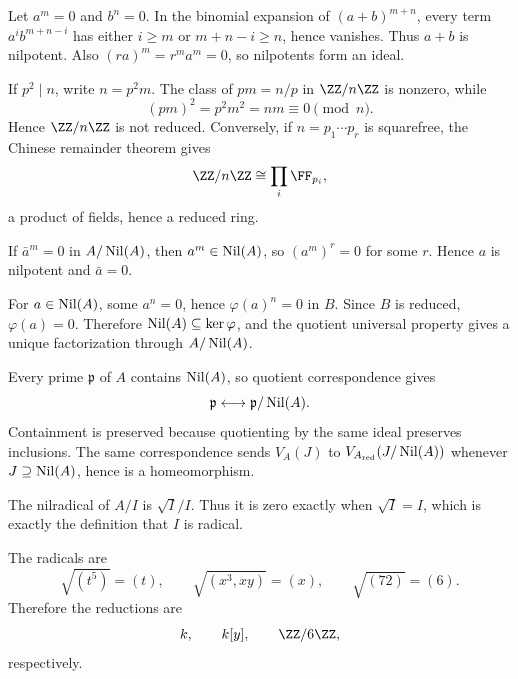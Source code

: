 \begin{solution}
Let $a^m=0$ and $b^n=0$.  In the binomial expansion of $(a+b)^{m+n}$, every term
$a^i b^{m+n-i}$ has either $i\ge m$ or $m+n-i\ge n$, hence vanishes.  Thus $a+b$ is
nilpotent.  Also $(ra)^m=r^m a^m=0$, so nilpotents form an ideal.
\end{solution}

\begin{solution}
If $p^2\mid n$, write $n=p^2m$.  The class of $pm=n/p$ in $\ZZ/n\ZZ$ is nonzero,
while
\[
(pm)^2=p^2m^2=n m\equiv0\pmod n.
\]
Hence $\ZZ/n\ZZ$ is not reduced.  Conversely, if $n=p_1\cdots p_r$ is squarefree,
the Chinese remainder theorem gives
\[
\ZZ/n\ZZ\cong\prod_i\FF_{p_i},
\]
a product of fields, hence a reduced ring.
\end{solution}

\begin{solution}
If $\bar a^m=0$ in $A/\operatorname{Nil}(A)$, then $a^m\in\operatorname{Nil}(A)$, so $(a^m)^r=0$ for some $r$.
Hence $a$ is nilpotent and $\bar a=0$.
\end{solution}

\begin{solution}
For $a\in\operatorname{Nil}(A)$, some $a^n=0$, hence $\varphi(a)^n=0$ in $B$.  Since $B$ is reduced,
$\varphi(a)=0$.  Therefore $\operatorname{Nil}(A)\subseteq\ker\varphi$, and the quotient universal
property gives a unique factorization through $A/\operatorname{Nil}(A)$.
\end{solution}

\begin{solution}
Every prime $\mathfrak p$ of $A$ contains $\operatorname{Nil}(A)$, so quotient correspondence gives
\[
\mathfrak p\longleftrightarrow \mathfrak p/\operatorname{Nil}(A).
\]
Containment is preserved because quotienting by the same ideal preserves inclusions.
The same correspondence sends $V_A(J)$ to
$V_{A_{\mathrm{red}}}(J/\operatorname{Nil}(A))$ whenever $J\supseteq\operatorname{Nil}(A)$, hence is a
homeomorphism.
\end{solution}

\begin{solution}
The nilradical of $A/I$ is $\sqrt I/I$.  Thus it is zero exactly when $\sqrt I=I$, which
is exactly the definition that $I$ is radical.
\end{solution}

\begin{solution}
The radicals are
\[
\sqrt{(t^5)}=(t),\qquad
\sqrt{(x^3,xy)}=(x),\qquad
\sqrt{(72)}=(6).
\]
Therefore the reductions are
\[
k,\qquad k[y],\qquad \ZZ/6\ZZ,
\]
respectively.
\end{solution}

